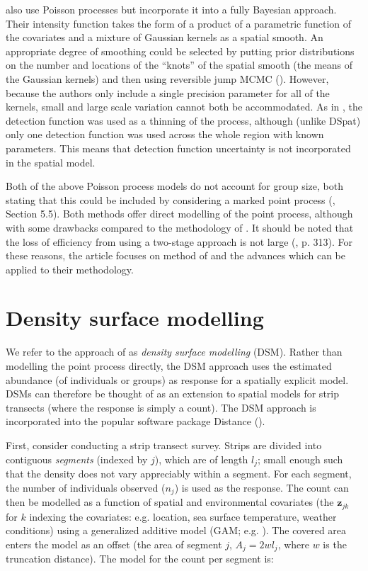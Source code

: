 \documentclass[a4paper,12pt]{article}
\begin{document}
\cite{Niemi:2010kx} also use Poisson processes but incorporate it into a fully Bayesian approach. Their intensity function takes the form of a product of a parametric function of the covariates and a mixture of Gaussian kernels as a spatial smooth. An appropriate degree of smoothing could be selected by putting prior distributions on the number and locations of the ``knots'' of the spatial smooth (the means of the Gaussian kernels) and then using reversible jump MCMC (\cite{GREEN:1995dg}). However, because the authors only include a single precision parameter for all of the kernels, small and large scale variation cannot both be accommodated. As in \cite{Johnson:2010gf}, the detection function was used as a thinning of the process, although (unlike DSpat) only one detection function was used across the whole region with known parameters. This means that detection function uncertainty is not incorporated in the spatial model.

Both of the above Poisson process models do not account for group size, both stating that this could be included by considering a marked point process (\cite{cox1980point}, Section 5.5). Both methods offer direct modelling of the point process, although with some drawbacks compared to the methodology of \cite{Hedley:2004et}. It should be noted that the loss of efficiency from using a two-stage approach is not large (\cite{Buckland:2004ts}, p. 313). For these reasons, the article focuses on method of \cite{Hedley:2004et} and the advances which can be applied to their methodology.

\section*{Density surface modelling}
\label{s:dsm}

We refer to the approach of \cite{Hedley:2004et} as \textit{density surface modelling} (DSM). Rather than modelling the point process directly, the DSM approach uses the estimated abundance (of individuals or groups) as response for a spatially explicit model. DSMs can therefore be thought of as an extension to spatial models for strip transects (where the response is simply a count). The DSM approach is incorporated into the popular software package Distance (\cite{Thomas:2010cf}). 

First, consider conducting a strip transect survey. Strips are divided into contiguous \textit{segments} (indexed by $j$), which are of length $l_j$; small enough such that the density does not vary appreciably within a segment. For each segment, the number of individuals observed ($n_j$) is used as the response.  The count can then be modelled as a function of spatial and environmental covariates (the $\mathbf{z}_{jk}$ for $k$ indexing the covariates: e.g. location, sea surface temperature, weather conditions) using a generalized additive model (GAM; e.g. \cite{Wood:2006wz}). The covered area enters the model as an offset (the area of segment $j$, $A_j = 2wl_j$, where $w$ is the truncation distance). The model for the count per segment is:
\end{document}
